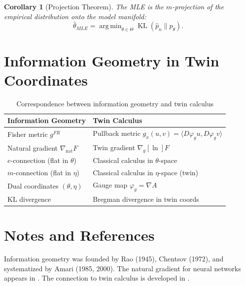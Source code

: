 \documentclass[11pt,twoside]{book}
\theoremstyle{plain}
\newtheorem{corollary}[theorem]{Corollary}
\theoremstyle{definition}
\theoremstyle{remark}
\DeclareMathOperator*{\argmin}{arg\,min}
\DeclareMathOperator{\KL}{KL}
\newcommand{\nablg}{\nabla_g}
\newcommand{\nabnat}{\nabla_{\mathrm{nat}}}
\begin{document}
\begin{corollary}[Projection Theorem]
    The MLE is the $m$-projection of the empirical distribution onto the model manifold:
    \[
    \hat{\theta}_{MLE} = \argmin_{\theta \in \Theta} \KL(\hat{p}_n \| p_\theta).
    \]
\end{corollary}

\section{Information Geometry in Twin Coordinates}
\label{sec:info_geom_twin}

\begin{table}[htbp]
    \centering
    \caption{Correspondence between information geometry and twin calculus}
    \label{tab:info_twin}
    \begin{tabular}{ll}
        \toprule
        \textbf{Information Geometry} & \textbf{Twin Calculus} \\
        \midrule
        Fisher metric $g^{FR}$ & Pullback metric $g_x(u,v) = \langle D\varphi_g u, D\varphi_g v \rangle$ \\
        Natural gradient $\nabnat F$ & Twin gradient $\nablg[\ln] F$ \\
        $e$-connection (flat in $\theta$) & Classical calculus in $\theta$-space \\
        $m$-connection (flat in $\eta$) & Classical calculus in $\eta$-space (twin) \\
        Dual coordinates $(\theta, \eta)$ & Gauge map $\varphi_g = \nabla A$ \\
        KL divergence & Bregman divergence in twin coords \\
        \bottomrule
    \end{tabular}
\end{table}

\section{Notes and References}
\label{sec:ch3_notes}

Information geometry was founded by Rao (1945), Chentsov (1972), and systematized by Amari (1985, 2000). The natural gradient for neural networks appears in \cite{amari1998natural}. The connection to twin calculus is developed in \cite{nembe2025}.

\end{document}
